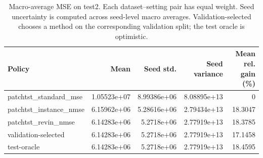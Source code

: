 \begin{table}[htbp]
\centering
\caption{Macro-average MSE on test2. Each dataset--setting pair has equal weight. Seed uncertainty is computed across seed-level macro averages. Validation-selected chooses a method on the corresponding validation split; the test oracle is optimistic.}
\begin{tabular}{lrrrr}
\toprule
Policy & Mean & Seed std. & Seed variance & Mean rel. gain (\%) \\
\midrule
patchtst\_standard\_mse & 1.05523e+07 & 8.99386e+06 & 8.08895e+13 & 0 \\
patchtst\_instance\_nmse & 6.15962e+06 & 5.28616e+06 & 2.79434e+13 & 18.3047 \\
patchtst\_revin\_nmse & 6.14283e+06 & 5.2718e+06 & 2.77919e+13 & 18.3785 \\
validation-selected & 6.14283e+06 & 5.2718e+06 & 2.77919e+13 & 17.1458 \\
\midrule
test-oracle & 6.14283e+06 & 5.2718e+06 & 2.77919e+13 & 18.4595 \\
\bottomrule
\end{tabular}
\end{table}
